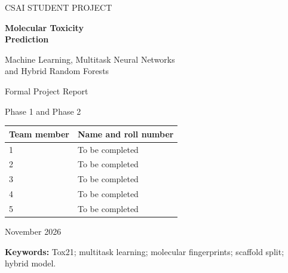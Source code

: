 \documentclass[11pt,a4paper]{article}\usepackage[margin=25mm]{geometry}\usepackage{fancyhdr}\usepackage{setspace}\usepackage{titlesec}\usepackage{xcolor}
\begin{document}
\begin{titlepage}
\centering
\vspace*{25mm}
{\large\textsf{CSAI STUDENT PROJECT}\par}
\vspace{18mm}
{\Huge\bfseries\color{reportnavy} Molecular Toxicity\\[6pt] Prediction\par}
\vspace{12mm}
{\Large Machine Learning, Multitask Neural Networks\\[5pt] and Hybrid Random Forests\par}
\vspace{15mm}
{\large Formal Project Report\par}
{\large Phase 1 and Phase 2\par}
\vfill
\begin{tabular}{ll}
\toprule
Team member & Name and roll number\\\midrule
1 & To be completed\\
2 & To be completed\\
3 & To be completed\\
4 & To be completed\\
5 & To be completed\\\bottomrule
\end{tabular}
\vspace{15mm}

{\large November 2026\par}
\end{titlepage}
\tableofcontents
\newpage
{}
\begin{abstract}
We compare classical machine learning, a multitask neural network, and a hybrid neural-feature Random Forest for 12 Tox21 assay endpoints. The pipeline uses 7,823 valid molecules and a frozen scaffold partition of 6,259 training, 782 validation and 782 test molecules. Inputs combine 2,048 Morgan fingerprint bits with five standardized descriptors. Unmeasured assay labels are excluded from optimization and evaluation. The historical standalone Random Forest reports macro ROC-AUC 0.7541, compared with 0.7179 in the original neural evaluation and 0.6753 for the hybrid. A separate three-seed multitask experiment reports 0.7472 with standard deviation 0.0065. A separately verified inference bundle achieves ROC-AUC 0.7498 (RF), 0.7318 (DL) and 0.7182 (hybrid). Both evaluations favor the standalone forest; hybrid representation learning does not yield a measured improvement. A Streamlit demonstration applies the saved models to new SMILES inputs and exports endpoint-level scores.
\end{abstract}
\noindent\textbf{Keywords:} Tox21; multitask learning; molecular fingerprints; scaffold split; hybrid model.\medskip
\end{document}
